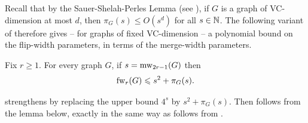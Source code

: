     Recall that by the Sauer-Shelah-Perles Lemma (see ), 
    if $G$ is a graph of VC-dimension at most $d$,
    then $\pi_G(s)\le O(s^d)$ for all $s\in\mathbb N$. The following variant of 
     therefore gives -- for graphs of fixed VC-dimension -- a polynomial bound on the flip-width parameters, in terms of the merge-width parameters.

    
    \begin{lemma}\label{lem:fw-poly}Fix $r\ge 1$.
        For every graph $G$, if 
        $s=\operatorname{mw}_{2r-1}(G)$ then        
        $$\operatorname{fw}_r(G)\leqslant s^2+\pi_G(s).$$
    \end{lemma}
 strengthens 
  by replacing the upper bound $4^s$ by $s^2+\pi_G(s)$.
    Then  follows from the lemma below, 
    exactly in the same way as  follows from .
    
